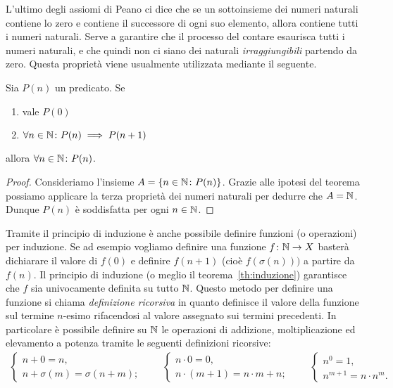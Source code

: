 L'ultimo degli assiomi di Peano 
ci dice che se un sottoinsieme dei numeri naturali contiene lo 
zero e contiene il successore di ogni suo elemento, allora contiene tutti i 
numeri naturali.
Serve a garantire che il processo del contare esaurisca tutti 
i numeri naturali, e che quindi non ci siano dei naturali \emph{irraggiungibili}
partendo da zero.
Questa proprietà viene usualmente utilizzata mediante il seguente.


%
%
\begin{theorem}
  Sia $P(n)$ un predicato.
  Se 
  \begin{enumerate}
    \item vale $P(0)$
    \item $\forall n\in {\mathbb N}\colon P(n)\implies P(n+1)$
  \end{enumerate} 
  allora $\forall n\in {\mathbb N}\colon P(n)$.
\end{theorem}
%
\begin{proof}
  Consideriamo l'insieme $A=\{n\in {\mathbb N}\colon P(n)\}$.
  Grazie alle ipotesi del teorema possiamo applicare la terza
  proprietà dei numeri naturali per dedurre che $A={\mathbb N}$.
  Dunque $P(n)$ è soddisfatta per ogni $n\in{\mathbb N}$.
\end{proof}

Tramite il principio di induzione è anche possibile 
definire funzioni (o operazioni) per induzione.
Se ad esempio vogliamo definire una funzione $f\colon {\mathbb N}\to X$
basterà dichiarare il valore di $f(0)$ e definire $f(n+1)$ 
(cioè $f(\sigma(n)))$ a partire da $f(n)$.
Il principio di induzione (o meglio il teorema~\ref{th:induzione})
garantisce che $f$ sia univocamente definita su tutto ${\mathbb N}$.
Questo metodo per definire una funzione si chiama 
\emph{definizione ricorsiva} in quanto definisce 
il valore della funzione sul termine $n$-esimo rifacendosi
al valore assegnato sui termini precedenti.
In particolare è possibile definire
su ${\mathbb N}$ le operazioni di addizione, 
moltiplicazione ed elevamento a potenza
tramite le seguenti definizioni ricorsive:
%
%
%
\begin{gather*}
  \begin{cases}
    n + 0 = n,\\
    n + \sigma(m) = \sigma(n+m);
  \end{cases}
  \qquad
  \begin{cases}
    n \cdot 0 = 0,\\
    n \cdot (m+1) = n\cdot m + n;
  \end{cases}
  \qquad
  \begin{cases}
    n^0 = 1,\\
    n^{m+1} = n\cdot n^m.
  \end{cases}
\end{gather*}

